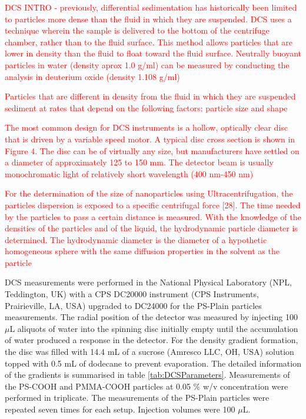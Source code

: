 \textcolor{red}{DCS INTRO - previously, differential sedimentation has historically been limited to particles more dense than the fluid in which they are suspended. DCS uses a technique wherein the sample is delivered to the bottom of the centrifuge chamber, rather than to the fluid surface. This method allows particles that are lower in density than the fluid to float toward the fluid surface. Neutrally buoyant particles in water (density aprox 1.0 g/ml) can be measured by conducting the analysis in deuterium oxide (density 1.108 g/ml)}

\textcolor{red}{Particles that are different in density from the fluid in which they are suspended sediment at rates that depend on the following factors: particle size and shape}

\textcolor{red}{The most common design for DCS instruments is a hollow, optically clear disc that is driven by a variable speed motor. A typical disc cross section is shown in Figure 4. The disc can be of virtually any size, but manufacturers have settled on a diameter of approximately 125 to 150 mm. The detector beam is usually monochromatic light of relatively short wavelength (400 nm-450 nm)}

\textcolor{red}{For the determination of the size of nanoparticles using Ultracentrifugation, the particles dispersion is exposed to a specific centrifugal force [28]. The time needed by the particles to pass a certain distance is measured. With the knowledge of the densities of the particles and of the liquid, the hydrodynamic particle diameter is determined. The hydrodynamic diameter is the diameter of a hypothetic homogeneous sphere with the same diffusion properties in the solvent as the particle}

DCS measurements were performed in the National Physical Laboratory (NPL, Teddington, UK) with a CPS DC20000 instrument (CPS Instruments, Prairieville, LA, USA) upgraded to DC24000 for the PS-Plain particles measurements. The radial position of the detector was measured by injecting 100 $\mu$L aliquots of water into the spinning disc initially empty until the accumulation of water produced a response in the detector. For the density gradient formation, the disc was filled with 14.4 mL of a sucrose (Amresco LLC, OH, USA) solution topped with 0.5 mL of dodecane to prevent evaporation. The detailed information of the gradients is summarised in table \ref{tab:DCSParameters}. Measurements of the PS-COOH and PMMA-COOH particles at 0.05 \% w/v concentration were performed in triplicate. The measurements of the PS-Plain particles were repeated seven times for each setup. Injection volumes were 100 $\mu$L. 

